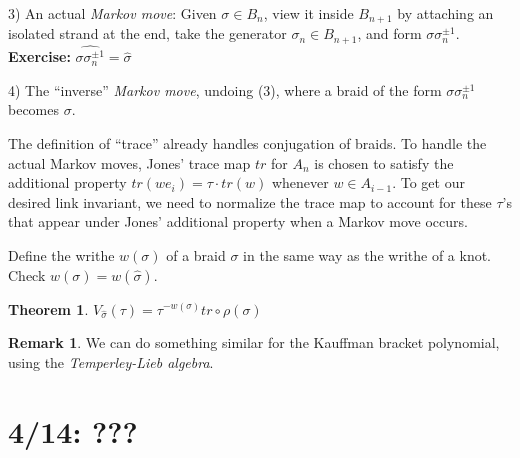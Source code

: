 \documentclass[11pt]{article}
\theoremstyle{plain}
\newtheorem{thm}{Theorem}
\theoremstyle{definition}
\newtheorem{remark}{Remark}
\begin{document}
3) An actual \textit{Markov move}: Given $\sigma\in B_n$, view it inside $B_{n+1}$ by attaching an isolated strand at the end, take the generator $\sigma_n\in B_{n+1}$, and form $\sigma\sigma_n^{\pm 1}$. \textbf{Exercise:} $\widehat{\sigma\sigma_n^{\pm 1}}=\hat\sigma$

4) The ``inverse'' \textit{Markov move}, undoing (3), where a braid of the form $\sigma\sigma_n^{\pm 1}$ becomes $\sigma$.

\bigskip
The definition of ``trace'' already handles conjugation of braids. To handle the actual Markov moves, Jones' trace map $tr$ for $A_n$ is chosen to satisfy the additional property $tr(we_i)=\tau\cdot tr(w)$ whenever $w\in A_{i-1}$. To get our desired link invariant, we need to normalize the trace map to account for these $\tau$'s that appear under Jones' additional property when a Markov move occurs.

\bigskip
Define the writhe $w(\sigma)$ of a braid $\sigma$ in the same way as the writhe of a knot. Check $w(\sigma)=w(\hat\sigma)$.

\begin{thm}
$V_{\widehat\sigma}(\tau)=\tau^{-w(\sigma)}tr\circ\rho(\sigma)$
\end{thm}



\begin{remark}
We can do something similar for the Kauffman bracket polynomial, using the \textit{Temperley-Lieb algebra}.
\end{remark}














\clearpage
\section{4/14: ???}
\end{document}
